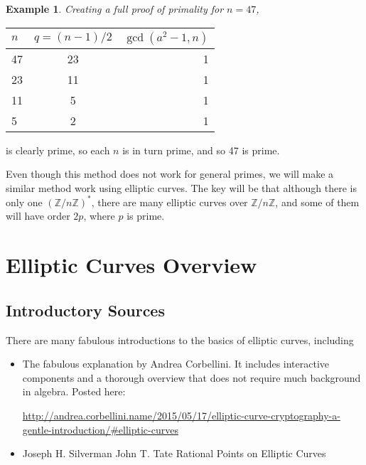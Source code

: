 \documentclass[]{article}
\newtheorem{benexample}{Example}
\newcommand{\Z}{\mathbb{Z}}
\newcommand{\ZMZ}[1]{\Z/#1\Z}
\begin{document}
\begin{mdframed}[linewidth=2pt]

	 \begin{benexample}
		Creating a full proof of primality for $n=47$,
	\end{benexample}

	\begin{tabular}{| l | c | r |}
		\hline
		$n$ & $q=(n-1)/2$ & $\gcd(a^2-1,n)$ \\
		\hline
		47 & 23 & 1\\ \hline \hline
		23 & 11 & 1\\ \hline
		11 & 5 & 1\\ \hline
		5 & 2 & 1\\ \hline

	\end{tabular}

\vspace{2pt}
	 is clearly prime, so each $n$ is in turn prime, and so 47 is prime.

\end{mdframed}

Even though this method does not work for general primes, we will make a similar method work using elliptic curves. The key will be that although there is only one $(\ZMZ{n})^*$, there are many elliptic curves over $\ZMZ{n}$, and some of them will have order $2p$, where $p$ is prime.

\section{Elliptic Curves Overview}

\subsection{Introductory Sources}

There are many fabulous introductions to the basics of elliptic curves, including

\begin{itemize}
	\item The fabulous explanation by Andrea Corbellini. It includes interactive components and a thorough overview that does not require much background in algebra. Posted here:

	\url{http://andrea.corbellini.name/2015/05/17/elliptic-curve-cryptography-a-gentle-introduction/#elliptic-curves}
	\item Joseph H. Silverman
	John T. Tate
	Rational
	Points on
	Elliptic Curves
\end{itemize}
\end{document}
